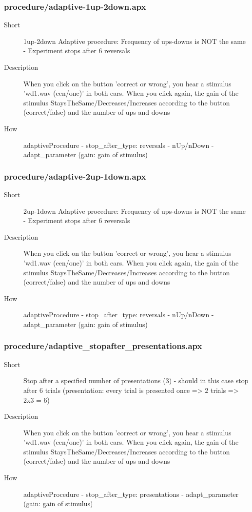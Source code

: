 \subsubsection{procedure/adaptive-1up-2down.apx}
\begin{description}
\item[Short] 
 1up-2down Adaptive procedure: Frequency of ups-downs is NOT the same - Experiment stops after 6 reversals
\item[Description] 
 When you click on the button 'correct or wrong', you hear a stimulus 'wd1.wav (een/one)' in both ears. When you click again, the gain of the stimulus StaysTheSame/Decreases/Increases according to the button (correct/false) and the number of ups and downs
\item[How] 
 adaptiveProcedure - stop\_after\_type: reversals - nUp/nDown - adapt\_parameter (gain: gain of stimulus)
\end{description}

\subsubsection{procedure/adaptive-2up-1down.apx}
\begin{description}
\item[Short] 
 2up-1down Adaptive procedure: Frequency of ups-downs is NOT the same - Experiment stops after 6 reversals
\item[Description] 
 When you click on the button 'correct or wrong', you hear a stimulus 'wd1.wav (een/one)' in both ears. When you click again, the gain of the stimulus StaysTheSame/Decreases/Increases according to the button (correct/false) and the number of ups and downs
\item[How] 
 adaptiveProcedure - stop\_after\_type: reversals - nUp/nDown - adapt\_parameter (gain: gain of stimulus)
\end{description}

\subsubsection{procedure/adaptive\_stopafter\_presentations.apx}
\begin{description}
\item[Short] 
 Stop after a specified number of presentations (3) - should in this case stop after 6 trials (presentation: every trial is presented once =\textgreater{} 2 trials =\textgreater{} 2x3 = 6)
\item[Description] 
 When you click on the button 'correct or wrong', you hear a stimulus 'wd1.wav (een/one)' in both ears. When you click again, the gain of the stimulus StaysTheSame/Decreases/Increases according to the button (correct/false) and the number of ups and downs
\item[How] 
 adaptiveProcedure - stop\_after\_type: presentations - adapt\_parameter (gain: gain of stimulus)
\end{description}

